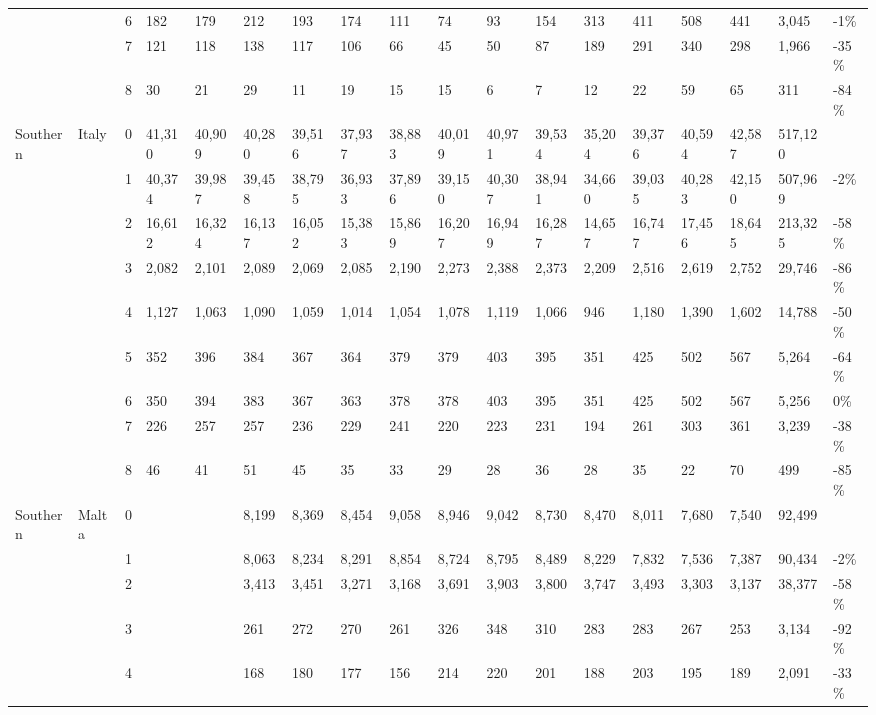 \begin{longtable}{llllllllllllllllll}
   &  & 6 & 182 & 179 & 212 & 193 & 174 & 111 & 74 & 93 & 154 & 313 & 411 & 508 & 441 & 3,045 & -1\% \\ 
   &  & 7 & 121 & 118 & 138 & 117 & 106 & 66 & 45 & 50 & 87 & 189 & 291 & 340 & 298 & 1,966 & -35\% \\ 
   &  & 8 & 30 & 21 & 29 & 11 & 19 & 15 & 15 & 6 & 7 & 12 & 22 & 59 & 65 & 311 & -84\% \\ 
  Southern & Italy & 0 & 41,310 & 40,909 & 40,280 & 39,516 & 37,937 & 38,883 & 40,019 & 40,971 & 39,534 & 35,204 & 39,376 & 40,594 & 42,587 & 517,120 &  \\ 
   &  & 1 & 40,374 & 39,987 & 39,458 & 38,795 & 36,933 & 37,896 & 39,150 & 40,307 & 38,941 & 34,660 & 39,035 & 40,283 & 42,150 & 507,969 & -2\% \\ 
   &  & 2 & 16,612 & 16,324 & 16,137 & 16,052 & 15,383 & 15,869 & 16,207 & 16,949 & 16,287 & 14,657 & 16,747 & 17,456 & 18,645 & 213,325 & -58\% \\ 
   &  & 3 & 2,082 & 2,101 & 2,089 & 2,069 & 2,085 & 2,190 & 2,273 & 2,388 & 2,373 & 2,209 & 2,516 & 2,619 & 2,752 & 29,746 & -86\% \\ 
   &  & 4 & 1,127 & 1,063 & 1,090 & 1,059 & 1,014 & 1,054 & 1,078 & 1,119 & 1,066 & 946 & 1,180 & 1,390 & 1,602 & 14,788 & -50\% \\ 
   &  & 5 & 352 & 396 & 384 & 367 & 364 & 379 & 379 & 403 & 395 & 351 & 425 & 502 & 567 & 5,264 & -64\% \\ 
   &  & 6 & 350 & 394 & 383 & 367 & 363 & 378 & 378 & 403 & 395 & 351 & 425 & 502 & 567 & 5,256 & 0\% \\ 
   &  & 7 & 226 & 257 & 257 & 236 & 229 & 241 & 220 & 223 & 231 & 194 & 261 & 303 & 361 & 3,239 & -38\% \\ 
   &  & 8 & 46 & 41 & 51 & 45 & 35 & 33 & 29 & 28 & 36 & 28 & 35 & 22 & 70 & 499 & -85\% \\ 
  Southern & Malta & 0 &  &  & 8,199 & 8,369 & 8,454 & 9,058 & 8,946 & 9,042 & 8,730 & 8,470 & 8,011 & 7,680 & 7,540 & 92,499 &  \\ 
   &  & 1 &  &  & 8,063 & 8,234 & 8,291 & 8,854 & 8,724 & 8,795 & 8,489 & 8,229 & 7,832 & 7,536 & 7,387 & 90,434 & -2\% \\ 
   &  & 2 &  &  & 3,413 & 3,451 & 3,271 & 3,168 & 3,691 & 3,903 & 3,800 & 3,747 & 3,493 & 3,303 & 3,137 & 38,377 & -58\% \\ 
   &  & 3 &  &  & 261 & 272 & 270 & 261 & 326 & 348 & 310 & 283 & 283 & 267 & 253 & 3,134 & -92\% \\ 
   &  & 4 &  &  & 168 & 180 & 177 & 156 & 214 & 220 & 201 & 188 & 203 & 195 & 189 & 2,091 & -33\% \\ 

\end{longtable}
